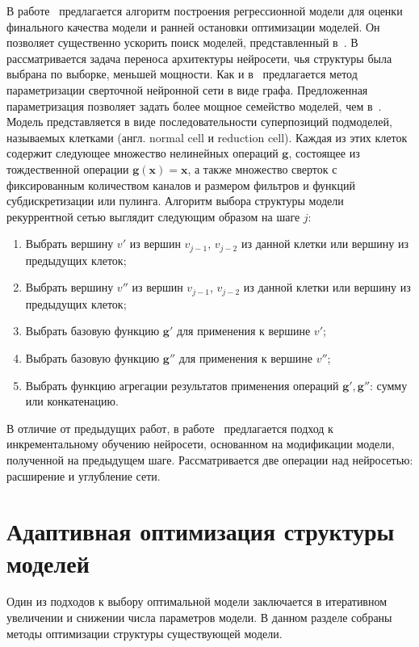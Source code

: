 В работе~\cite{reinf_predict} предлагается алгоритм построения регрессионной модели для оценки финального качества модели и ранней остановки оптимизации моделей. Он позволяет существенно ускорить поиск моделей, представленный в~\cite{reinf}.
В~\cite{reinf_transfer} рассматривается задача переноса архитектуры нейросети, чья структуры была выбрана по выборке, меньшей мощности. Как и в~\cite{reinf} предлагается метод параметризации сверточной нейронной сети в виде графа. Предложенная параметризация позволяет задать более мощное семейство моделей, чем в~\cite{reinf}. Модель представляется в виде последовательности суперпозиций подмоделей, называемых клетками (англ. normal cell и reduction cell). Каждая из этих клеток содержит следующее множество нелинейных операций $\mathbf{g}$, состоящее из тождественной операции $\mathbf{g}(\mathbf{x}) = \mathbf{x}$, а также множество сверток с фиксированным количеством каналов и размером фильтров и функций субдискретизации или пулинга.
Алгоритм выбора структуры модели рекуррентной сетью выглядит следующим образом на шаге $j$:
\begin{enumerate}
\item Выбрать вершину $v'$ из вершин $v_{j-1}$, $v_{j-2}$ из данной клетки или вершину из предыдущих клеток;
\item Выбрать вершину $v''$ из вершин $v_{j-1}$, $v_{j-2}$ из данной клетки или вершину из предыдущих клеток;
\item Выбрать базовую функцию $\mathbf{g}'$ для применения к вершине $v'$;
\item Выбрать базовую функцию $\mathbf{g}''$ для применения к вершине $v''$;
\item Выбрать функцию агрегации результатов применения операций $\mathbf{g}',\mathbf{g}''$: сумму или конкатенацию.
\end{enumerate}


В отличие от предыдущих работ, в работе~\cite{reinf_deep2net} предлагается подход к инкрементальному обучению нейросети, основанном на модификации модели, полученной на предыдущем шаге. Рассматривается две операции над нейросетью: расширение и углубление сети.


\section{Адаптивная оптимизация структуры моделей}
Один из подходов к выбору оптимальной модели заключается в итеративном увеличении и снижении числа параметров модели. 
В данном разделе собраны методы оптимизации структуры существующей модели. 

